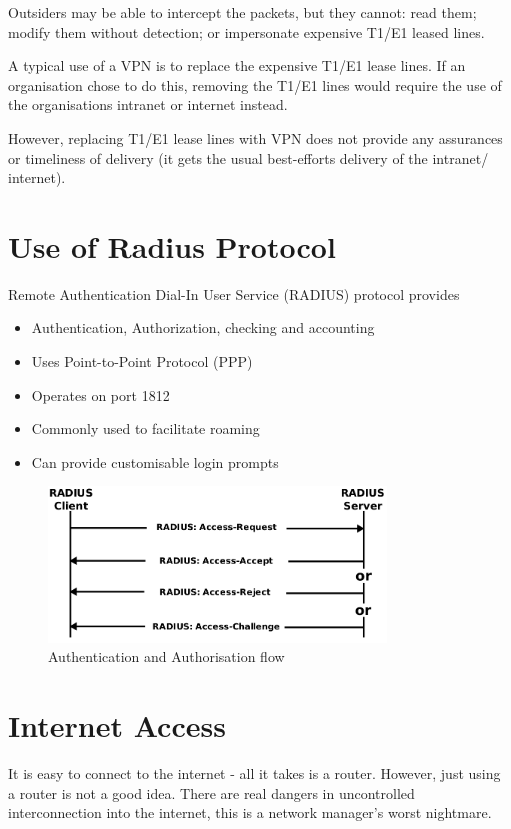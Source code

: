 Outsiders may be able to intercept the packets, but they cannot: read them; modify them without detection; or impersonate expensive T1/E1 leased lines.

A typical use of a VPN is to replace the expensive T1/E1 lease lines. If an organisation chose to do this, removing the T1/E1 lines would require the use of the organisations intranet or internet instead.

However, replacing T1/E1 lease lines with VPN does not provide any assurances or timeliness of delivery (it gets the usual best-efforts delivery of the intranet/ internet). 

\section*{Use of Radius Protocol}
Remote Authentication Dial-In User Service (RADIUS) protocol provides
\begin{itemize}
    \item Authentication, Authorization, checking and accounting
    \item Uses Point-to-Point Protocol (PPP)
    \item Operates on port 1812
    \item Commonly used to facilitate roaming
    \item Can provide customisable login prompts
\end{itemize}
\begin{figure}[H]
    \centering
    \includegraphics*[width=0.8\textwidth]{assets/radius-protocol-flow.png}
    \caption*{Authentication and Authorisation flow} 
\end{figure}

\section*{Internet Access}
It is easy to connect to the internet - all it takes is a router. However, just using a router is not a good idea. There are real dangers in uncontrolled interconnection into the internet, this is a network manager's worst nightmare. 
